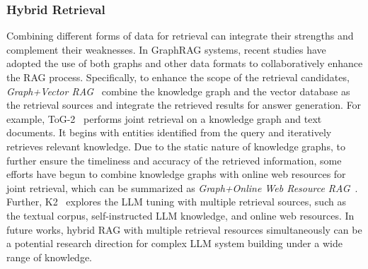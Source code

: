 \documentclass[lettersize,journal]{IEEEtran}
\begin{document}
\subsubsection{Hybrid Retrieval} Combining different forms of data for retrieval can integrate their strengths and complement their weaknesses. In GraphRAG systems, recent studies have adopted the use of both graphs and other data formats to collaboratively enhance the RAG process.
Specifically, to enhance the scope of the retrieval candidates, \textit{Graph+Vector RAG}~\cite{xu2024retrieval,sarmah2024hybridrag} combine the knowledge graph and the vector database as the retrieval sources and integrate the retrieved results for answer generation. For example, ToG-2~\cite{ma2024think-on-graph-2.0} performs joint retrieval on a knowledge graph and text documents. It begins with entities identified from the query and iteratively retrieves relevant knowledge.
Due to the static nature of knowledge graphs, to further ensure the timeliness and accuracy of the retrieved information, some efforts have begun to combine knowledge graphs with online web resources for joint retrieval, which can be summarized as \textit{Graph+Online Web Resource RAG}~\cite{xie2024weknow,mendes2024application,alhanahnah2024depesrag,dehghan2024ewek,zhao2024bridging,bayat2023fleek}.
Further, K2~\cite{deng2024k2} explores the LLM tuning with multiple retrieval sources, such as the textual corpus, self-instructed LLM knowledge, and online web resources.
In future works, hybrid RAG with multiple retrieval resources simultaneously can be a potential research direction for complex LLM system building under a wide range of knowledge.
\end{document}
